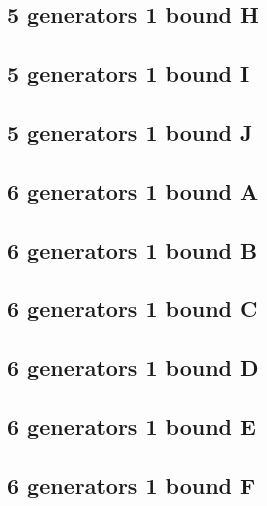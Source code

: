 \documentclass{TC}
\begin{document}
{\subsection{5 generators 1 bound H}

\newpage

\subsection{5 generators 1 bound I}
\label{fail4} %

\newpage

\subsection{5 generators 1 bound J}

\newpage




\subsection{6 generators 1 bound A}


\newpage

\subsection{6 generators 1 bound B}


\newpage

\subsection{6 generators 1 bound C}


\newpage

\subsection{6 generators 1 bound D}

\newpage

\subsection{6 generators 1 bound E}

\newpage

\subsection{6 generators 1 bound F}

\newpage

}
\end{document}
